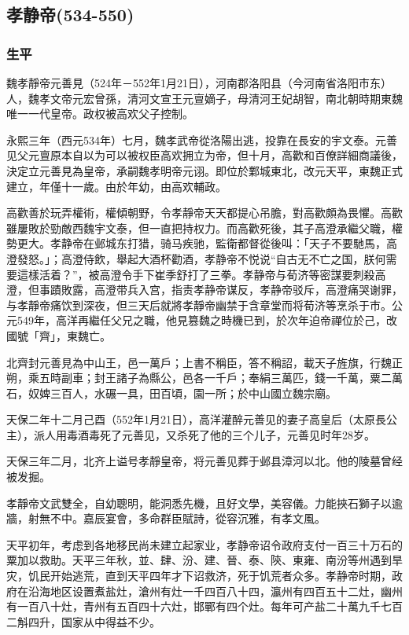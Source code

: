 
\subsection{孝静帝\tiny(534-550)}

\subsubsection{生平}

魏孝靜帝元善見（524年－552年1月21日），河南郡洛阳县（今河南省洛阳市东）人，魏孝文帝元宏曾孫，清河文宣王元亶嫡子，母清河王妃胡智，南北朝時期東魏唯一一代皇帝。政权被高欢父子控制。

永熙三年（西元534年）七月，魏孝武帝從洛陽出逃，投靠在長安的宇文泰。元善见父元亶原本自以为可以被权臣高欢拥立为帝，但十月，高歡和百僚詳細商議後，決定立元善見為皇帝，承嗣魏孝明帝元诩。即位於鄴城東北，改元天平，東魏正式建立，年僅十一歲。由於年幼，由高欢輔政。

高歡善於玩弄權術，權傾朝野，令孝靜帝天天都提心吊膽，對高歡頗為畏懼。高歡雖屢敗於勁敵西魏宇文泰，但一直把持权力。而高歡死後，其子高澄承繼父職，權勢更大。孝静帝在邺城东打猎，骑马疾驰，監衛都督從後叫：「天子不要馳馬，高澄發怒。」；高澄侍飲，舉起大酒杯勸酒，孝静帝不悦说“自古无不亡之国，朕何需要這樣活着？”，被高澄令手下崔季舒打了三拳。孝静帝与荀济等密謀要刺殺高澄，但事蹟敗露，高澄带兵入宫，指责孝静帝谋反，孝静帝驳斥，高澄痛哭谢罪，与孝靜帝痛饮到深夜，但三天后就將孝靜帝幽禁于含章堂而将荀济等烹杀于市。公元549年，高洋再繼任父兄之職，他見篡魏之時機已到，於次年迫帝禪位於己，改國號「齊」，東魏亡。

北齊封元善見為中山王，邑一萬戶；上書不稱臣，答不稱詔，載天子旌旗，行魏正朔，乘五時副車；封王諸子為縣公，邑各一千戶；奉絹三萬匹，錢一千萬，粟二萬石，奴婢三百人，水碾一具，田百頃，園一所；於中山國立魏宗廟。

天保二年十二月己酉（552年1月21日），高洋灌醉元善见的妻子高皇后（太原長公主），派人用毒酒毒死了元善见，又杀死了他的三个儿子，元善见时年28岁。

天保三年二月，北齐上谥号孝靜皇帝，将元善见葬于邺县漳河以北。他的陵墓曾经被发掘。

孝靜帝文武雙全，自幼聰明，能洞悉先機，且好文學，美容儀。力能挾石獅子以逾牆，射無不中。嘉辰宴會，多命群臣賦詩，從容沉雅，有孝文風。

天平初年，考虑到各地移民尚未建立起家业，孝静帝诏令政府支付一百三十万石的粟加以救助。天平三年秋，並、肆、汾、建、晉、泰、陝、東雍、南汾等州遇到旱灾，饥民开始逃荒，直到天平四年才下诏救济，死于饥荒者众多。孝静帝时期，政府在沿海地区设置煮盐灶，滄州有灶一千四百八十四，瀛州有四百五十二灶，幽州有一百八十灶，青州有五百四十六灶，邯鄲有四个灶。每年可产盐二十萬九千七百二斛四升，国家从中得益不少。

